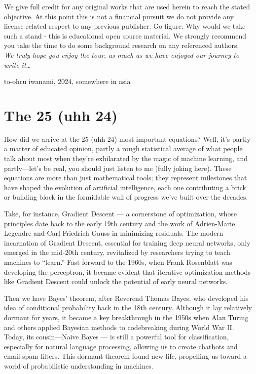 \documentclass[
  12 pt,
  a4paper,
]{book}
\numberwithin{equation}{section}
\theoremstyle{plain}      %
\theoremstyle{definition} %
\theoremstyle{remark}     %
\theoremstyle{note}         %
\begin{document}
We give full credit for any original works that are used herein to reach
the stated objective. At this point this is not a financial pursuit we
do not provide any license related respect to any previous publisher. Go
figure. Why would we take such a stand - this is educational open source
material. We strongly recommend you take the time to do some background
research on any referenced authors.\\

\emph{We truly hope you enjoy the tour, as much as we have enjoyed our
journey to write it\ldots{}}

to-ohru iwanami, 2024, somewhere in asia

\hypertarget{the-25-uhh-24}{%
\chapter{The 25 (uhh 24)}\label{the-25-uhh-24}}

How did we arrive at the 25 (uhh 24) most important equations? Well,
it's partly a matter of educated opinion, partly a rough statistical
average of what people talk about most when they're exhilarated by the
magic of machine learning, and partly---let's be real, you should just
listen to me (fully joking here). These equations are more than just
mathematical tools; they represent milestones that have shaped the
evolution of artificial intelligence, each one contributing a brick or
building block in the formidable wall of progress we've built over the
decades.

Take, for instance, Gradient Descent --- a cornerstone of optimization,
whose principles date back to the early 19th century and the work of
Adrien-Marie Legendre and Carl Friedrich Gauss in minimizing residuals.
The modern incarnation of Gradient Descent, essential for training deep
neural networks, only emerged in the mid-20th century, revitalized by
researchers trying to teach machines to ``learn.'' Fast forward to the
1960s, when Frank Rosenblatt was developing the perceptron, it became
evident that iterative optimization methods like Gradient Descent could
unlock the potential of early neural networks.

Then we have Bayes' theorem, after Reverend Thomas Bayes, who developed
his idea of conditional probability back in the 18th century. Although
it lay relatively dormant for years, it became a key breakthrough in the
1950s when Alan Turing and others applied Bayesian methods to
codebreaking during World War II. Today, its cousin---Naive Bayes --- is
still a powerful tool for classification, especially for natural
language processing, allowing us to create chatbots and email spam
filters. This dormant theorem found new life, propelling us toward a
world of probabilistic understanding in machines.
\end{document}
